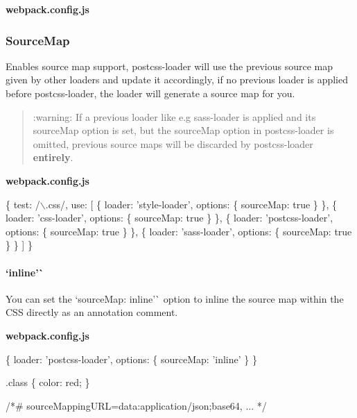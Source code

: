 {\bfseries webpack.\+config.\+js} 


\subsubsection*{{\ttfamily Source\+Map}}

Enables source map support, {\ttfamily postcss-\/loader} will use the previous source map given by other loaders and update it accordingly, if no previous loader is applied before {\ttfamily postcss-\/loader}, the loader will generate a source map for you.

\begin{quote}
\+:warning\+: If a previous loader like e.\+g {\ttfamily sass-\/loader} is applied and it\textquotesingle{}s {\ttfamily source\+Map} option is set, but the {\ttfamily source\+Map} option in {\ttfamily postcss-\/loader} is omitted, previous source maps will be discarded by {\ttfamily postcss-\/loader} {\bfseries entirely}. \end{quote}


{\bfseries webpack.\+config.\+js} 
\begin{DoxyCode}
\{
  test: /\(\backslash\).css/,
  use: [
    \{ loader: 'style-loader', options: \{ sourceMap: true \} \},
    \{ loader: 'css-loader', options: \{ sourceMap: true \} \},
    \{ loader: 'postcss-loader', options: \{ sourceMap: true \} \},
    \{ loader: 'sass-loader', options: \{ sourceMap: true \} \}
  ]
\}
\end{DoxyCode}


\paragraph*{`\textquotesingle{}inline'\`{}}

You can set the `source\+Map\+: \textquotesingle{}inline'\`{} option to inline the source map within the C\+SS directly as an annotation comment.

{\bfseries webpack.\+config.\+js} 
\begin{DoxyCode}
\{
  loader: 'postcss-loader',
  options: \{
    sourceMap: 'inline'
  \}
\}
\end{DoxyCode}



\begin{DoxyCode}
.class \{ color: red; \}

/*# sourceMappingURL=data:application/json;base64, ... */
\end{DoxyCode}


